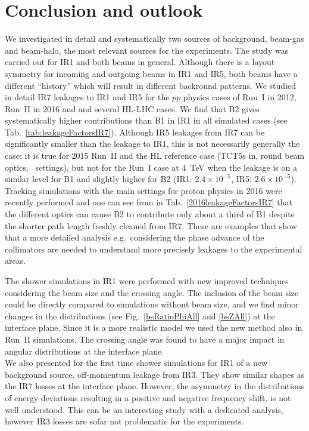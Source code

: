 \section{Conclusion and outlook~\label{last}}

We investigated in detail and systematically two sources of background, beam-gas and beam-halo, the most relevant sources for the experiments. The study was carried out for IR1 and both beams in general. Although there is a layout symmetry for incoming and outgoing beams in IR1 and IR5, both beams have a different ``history'' which will result in different backround patterns. We studied in detail IR7 leakages to IR1 and IR5 for the $pp$ physics cases of Run~I in 2012, Run~II in 2016 and and several HL-LHC cases. We find that B2 gives systematically higher contributions than B1 in IR1 in all simulated cases (see Tab.~\ref{tab:leakageFactorsIR7}). Although IR5 leakages from IR7 can be significantly smaller than the leakage to IR1, this is not necessarily generally the case: it is true for 2015 Run~II and the HL reference case (TCT5s in, round beam optics, \twosigmaret~settings), but not for the Run~I case at 4~TeV when the leakage is on a similar level for B1 and slightly higher for B2 (IR1: $2.4 \times 10^{-5}$, IR5: $2.6 \times 10^{-5}$). Tracking simulations with the main settings for proton physics in 2016 were recently performed and one can see from in Tab.~\ref{2016leakageFactorsIR7} that the different optics can cause B2 to contribute only about a third of B1 despite the shorter path length freshly cleaned from IR7. These are examples that show that a more detailed analysis e.g.~considering the phase advance of the collimators are needed to understand more precisely leakages to the experimental areas.

The shower simulations in IR1 were performed with new improved techniques considering the beam size and the crossing angle. The inclusion of the beam size could be directly compared to simulations without beam size, and we find minor changes in the distributions (see Fig.~\ref{bsRatioPhiAll} and \ref{bsZAll}) at the interface plane. Since it is a more realistic model we used the new method also in Run~II simulations. The crossing angle was found to have a major impact in angular distributions at the interface plane.\\

We also presented for the first time shower simulations for IR1 of a new background source, off-momentum leakage from IR3. They show similar shapes as the IR7 losses at the interface plane. However, the asymmetry in the distributions of energy deviations resulting in a positive and negative frequency shift, is not well understood. This can be an interesting study with a dedicated analysis, however IR3 losses are sofar not problematic for the experiments.\\


